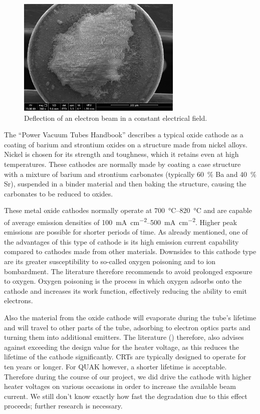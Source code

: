 \begin{figure}
	\centering
	\includegraphics[width=0.7\textwidth]{Chapters/CRT-Basics/SEM_image.png}
	\caption{Deflection of an electron beam in a constant electrical field.}
	\label{fig:SEM_Cathode}
\end{figure}

The ``Power Vacuum Tubes Handbook'' \cite[chp 3.5.2.1]{Whitaker} describes a typical oxide cathode as a coating of barium and strontium oxides on a structure made from nickel alloys. Nickel is chosen for its strength and toughness, which it retains even at high temperatures. These cathodes are normally made by coating a case structure with a mixture of barium and strontium carbonates (typically \SI{60}{\percent} Ba and \SI{40}{\percent} Sr), suspended in a binder material and then baking the structure, causing the carbonates to be reduced to oxides. 

These metal oxide cathodes normally operate at \SIrange{700}{820}{\celsius} and are capable of average emission densities of \SIrange{100}{500}{\milli\ampere\per\centi\meter\squared}. Higher peak emissions are possible for shorter periods of time. As already mentioned, one of the advantages of this type of cathode is its high emission current capability compared to cathodes made from other materials. Downsides to this cathode type are its greater susceptibility to so-called oxygen poisoning and to ion bombardment. The literature therefore recommends to avoid prolonged exposure to oxygen. Oxygen poisoning is the process in which oxygen adsorbs onto the cathode and increases its work function, effectively reducing the ability to emit electrons. 


Also the material from the oxide cathode will evaporate during the tube's lifetime and will travel to other parts of the tube, adsorbing to electron optics parts and turning them into additional emitters. The literature (\cite[chp 3.5.2.1]{Whitaker}) therefore, also advises against exceeding the design value for the heater voltage, as this reduces the lifetime of the cathode significantly. CRTs are typically designed to operate for ten years or longer. For QUAK however, a shorter lifetime is acceptable. Therefore during the course of our project, we did drive the cathode with higher heater voltages on various occasions in order to increase the available beam current. We still don't know exactly how fast the degradation due to this effect proceeds; further research is necessary.  

